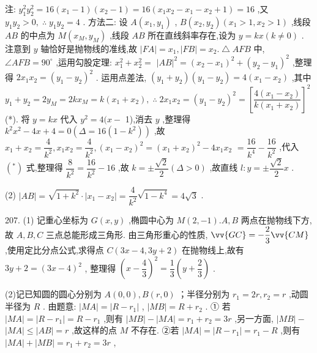 注: ${y}_{1}^{2}{y}_{2}^{2} = {16}\left( {{x}_{1} - 1}\right) \left( {{x}_{2} - 1}\right)  = {16}\left( {{x}_{1}{x}_{2} - {x}_{1} - {x}_{2} + 1}\right)  = {16}$ ,又 ${y}_{1}{y}_{2} > 0,\;\therefore \;{y}_{1}{y}_{2} = 4$ . 方法二: 设 $A\left( {{x}_{1},{y}_{1}}\right)$ , $B\left( {{x}_{2},{y}_{2}}\right) \left( {{x}_{1} > 1,{x}_{2} > 1}\right)$ ,线段 ${AB}$ 的中点为 $M\left( {{x}_{M},{y}_{M}}\right)$ ,线段 ${AB}$ 所在直线斜率存在,设为 $y = {kx}\left( {k \neq  0}\right)$ . 注意到 $y$ 轴恰好是抛物线的准线,故 $\left| {FA}\right|  = {x}_{1},\left| {FB}\right|  = {x}_{2}.\bigtriangleup {AFB}$ 中, $\angle {AFB} = {90}^{ \circ  }$ ,运用勾股定理: ${x}_{1}^{2} + {x}_{2}^{2} =$  ${\left| AB\right| }^{2} = {\left( {x}_{2} - {x}_{1}\right) }^{2} + {\left( {y}_{2} - {y}_{1}\right) }^{2}$ ,整理得 $2{x}_{1}{x}_{2} = {\left( {y}_{1} - {y}_{2}\right) }^{2}$ . 运用点差法, $\left( {{y}_{1} + {y}_{2}}\right) \left( {{y}_{1} - {y}_{2}}\right)  = 4\left( {{x}_{1} - {x}_{2}}\right)$ ,其中 ${y}_{1} + {y}_{2} = 2{y}_{M} = {2k}{x}_{M} = k\left( {{x}_{1} + {x}_{2}}\right) ,\;\therefore \;2{x}_{1}{x}_{2} = {\left( {y}_{1} - {y}_{2}\right) }^{2} = {\left\lbrack  \dfrac{4\left( {{x}_{1} - {x}_{2}}\right) }{k\left( {{x}_{1} + {x}_{2}}\right) }\right\rbrack  }^{2}$ (*). 将 $y = {kx}$ 代入 ${y}^{2} = 4(x -$ 1),消去 $y$ ,整理得 ${k}^{2}{x}^{2} - {4x} + 4 = 0\left( {\Delta  = {16}\left( {1 - {k}^{2}}\right) }\right)$ ,故 ${x}_{1} + {x}_{2} = \dfrac{4}{{k}^{2}},{x}_{1}{x}_{2} = \dfrac{4}{{k}^{2}},{\left( {x}_{1} - {x}_{2}\right) }^{2} = {\left( {x}_{1} + {x}_{2}\right) }^{2} - 4{x}_{1}{x}_{2}$  $= \dfrac{16}{{k}^{4}} - \dfrac{16}{{k}^{2}}$ ,代入 $\left( {}^{ * }\right)$ 式,整理得 $\dfrac{8}{{k}^{2}} = \dfrac{16}{{k}^{2}} - {16}$ ,故 $k =  \pm  \dfrac{\sqrt{2}}{2}\left( {\Delta  > 0}\right)$ ,故直线 $l : y =  \pm  \dfrac{\sqrt{2}}{2}x$ .

(2) $\left| {AB}\right|  = \sqrt{1 + {k}^{2}} \cdot  \left| {{x}_{1} - {x}_{2}}\right|  = \dfrac{4}{{k}^{2}}\sqrt{1 - {k}^{4}} = 4\sqrt{3}$ .

207. (1) 记重心坐标为 $G\left( {x,y}\right)$ ,椭圆中心为 $M\left( {2, - 1}\right) .A,B$ 两点在抛物线下方,故 $A,B,C$ 三点总能形成三角形. 由三角形重心的性质, $\vv{GC} =  - \dfrac{2}{3}\vv{CM}$ ,使用定比分点公式,求得点 $C\left( {{3x} - 4,{3y} + 2}\right)$ 在抛物线上,故有 ${3y} + 2 = {\left( 3x - 4\right) }^{2}$ , 整理得 ${\left( x - \dfrac{4}{3}\right) }^{2} = \dfrac{1}{3}\left( {y + \dfrac{2}{3}}\right)$ .

(2)记已知圆的圆心分别为 $A\left( {0,0}\right) ,B\left( {r,0}\right)$ ；半径分别为 ${r}_{1} = {2r},{r}_{2} = r$ ,动圆半径为 $R$ . 由题意: $\left| {MA}\right|  = \left| {R - {r}_{1}}\right|$ , $\left| {MB}\right|  = R + {r}_{2}$ . ① 若 $\left| {MA}\right|  = \left| {R - {r}_{1}}\right|  = R - {r}_{1}$ ,则有 $\left| {MB}\right|  - \left| {MA}\right|  = {r}_{1} + {r}_{2} = {3r}$ ,另一方面, $\left| {MB}\right|  -$  $\left| {MA}\right|  \leq  \left| {AB}\right|  = r$ ,故这样的点 $M$ 不存在. ②若 $\left| {MA}\right|  = \left| {R - {r}_{1}}\right|  = {r}_{1} - R$ ,则有 $\left| {MA}\right|  + \left| {MB}\right|  = {r}_{1} + {r}_{2} = {3r}$ ,

